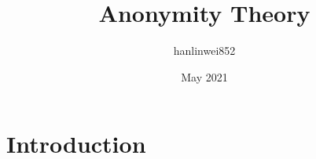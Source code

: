 \documentclass{article}
\title{Anonymity Theory}
\author{hanlinwei852 }
\date{May 2021}
\begin{document}
\maketitle

\section{Introduction}
\end{document}
